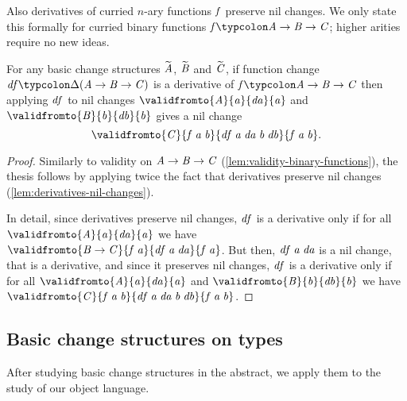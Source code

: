 Also derivatives of curried $n$-ary functions \ensuremath{\Varid{f}} preserve nil changes. We only
state this formally for curried binary functions \ensuremath{\Varid{f}\typcolon\Conid{A}\to \Conid{B}\to \Conid{C}}; higher
arities require no new ideas.
\begin{lemma}
  \label{lem:binary-derivatives-nil-changes}
  For any basic change structures \ensuremath{\widetilde{\Conid{A}}}, \ensuremath{\widetilde{\Conid{B}}} and \ensuremath{\widetilde{\Conid{C}}},
  if
  function change \ensuremath{\Varid{df}\typcolon\Delta (\Conid{A}\to \Conid{B}\to \Conid{C})} is a derivative of \ensuremath{\Varid{f}\typcolon\Conid{A}\to \Conid{B}\to \Conid{C}}
  then
  applying \ensuremath{\Varid{df}} to nil changes \ensuremath{\validfromto{\Conid{A}}{\Varid{a}}{\Varid{da}}{\Varid{a}}} and \ensuremath{\validfromto{\Conid{B}}{\Varid{b}}{\Varid{db}}{\Varid{b}}} gives a nil change
  \[\ensuremath{\validfromto{\Conid{C}}{\Varid{f}\;\Varid{a}\;\Varid{b}}{\Varid{df}\;\Varid{a}\;\Varid{da}\;\Varid{b}\;\Varid{db}}{\Varid{f}\;\Varid{a}\;\Varid{b}}}.\]
\end{lemma}
\begin{proof}
  Similarly to validity on \ensuremath{\Conid{A}\to \Conid{B}\to \Conid{C}} (\cref{lem:validity-binary-functions}),
  the thesis follows by applying twice the fact that derivatives preserve nil
  changes (\cref{lem:derivatives-nil-changes}).

  In detail, since derivatives preserve nil changes, \ensuremath{\Varid{df}} is a derivative
  only if for all \ensuremath{\validfromto{\Conid{A}}{\Varid{a}}{\Varid{da}}{\Varid{a}}} we have \ensuremath{\validfromto{\Conid{B}\to \Conid{C}}{\Varid{f}\;\Varid{a}}{\Varid{df}\;\Varid{a}\;\Varid{da}}{\Varid{f}\;\Varid{a}}}. But then, \ensuremath{\Varid{df}\;\Varid{a}\;\Varid{da}} is a nil change, that is a derivative, and since it
  preserves nil changes, \ensuremath{\Varid{df}} is a derivative only if for all \ensuremath{\validfromto{\Conid{A}}{\Varid{a}}{\Varid{da}}{\Varid{a}}} and \ensuremath{\validfromto{\Conid{B}}{\Varid{b}}{\Varid{db}}{\Varid{b}}} we have \ensuremath{\validfromto{\Conid{C}}{\Varid{f}\;\Varid{a}\;\Varid{b}}{\Varid{df}\;\Varid{a}\;\Varid{da}\;\Varid{b}\;\Varid{db}}{\Varid{f}\;\Varid{a}\;\Varid{b}}}.
\end{proof}

\subsection{Basic change structures on types}
After studying basic change structures in the abstract, we apply them to the
study of our object language.

